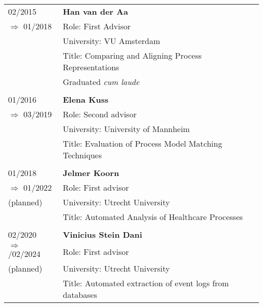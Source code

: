 \vspace*{0.5cm}
\raggedright
\begin{tabular}{P{3cm}P{12cm}}
02/2015  	& \textbf{Han van der Aa}\\
\hspace*{0.4cm}$\Rightarrow$ 01/2018		& Role: First Advisor \\
											& University: VU Amsterdam\\
											& Title: Comparing and Aligning Process Representations \\
											& Graduated \textit{cum laude} \\
											\\
01/2016 	& \textbf{Elena Kuss} \\
\hspace*{0.4cm}$\Rightarrow$ 03/2019									& Role: Second advisor \\
											& University: University of Mannheim \\
											& Title: Evaluation of Process Model Matching Techniques \\
											\\
01/2018  	& \textbf{Jelmer Koorn} \\
\hspace*{0.4cm} $\Rightarrow$ 01/2022 							& Role: First advisor \\	
\hspace*{0.4cm}(planned)										& University: Utrecht University \\
											& Title: Automated Analysis of Healthcare Processes \\
											\\ 	
02/2020 & \textbf{Vinicius Stein Dani} \\
\hspace*{0.4cm}$\Rightarrow$ /02/2024	 											& Role: First advisor \\	
\hspace*{0.4cm}	(planned)										& University: Utrecht University \\
											& Title: Automated extraction of event logs from databases  \\
\end{tabular}